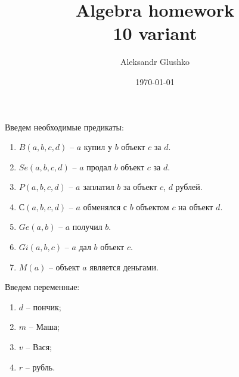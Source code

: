 \documentclass[a4paper,14pt]{article} %
\title{Algebra homework \\ 10 variant}
\author{Aleksandr Glushko}
\date{\today}
\begin{document}
\maketitle
\onehalfspacing
\section{}


Введем необходимые предикаты:
\begin{enumerate}
    \item $B(a, b, c, d)$ -- $a$ купил у $b$ объект $c$ за $d$.
    \item $Se(a, b, c, d)$ -- $a$ продал $b$ объект $c$ за $d$.
    \item $P(a, b, c, d)$ -- $a$ заплатил $b$ за объект $c$, $d$ рублей.
    \item $С(a, b, c, d)$ -- $a$ обменялся с $b$ объектом $c$ на объект $d$.
    \item $Ge(a, b)$ -- $a$ получил $b$.
    \item $Gi(a, b, c)$ -- $a$ дал $b$ объект $c$.
    \item $M(a)$ -- объект $a$ является деньгами.
\end{enumerate}

Введем переменные:
\begin{enumerate}
    \item $d$ -- пончик;
    \item $m$ -- Маша;
    \item $v$ -- Вася;
    \item $r$ -- рубль.
\end{enumerate}
\end{document}
